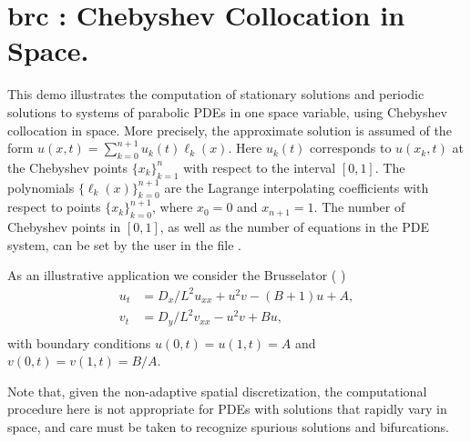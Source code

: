 \documentclass[12pt]{report}
\begin{document}
\newpage
\section{ brc : Chebyshev Collocation in Space.} \label{sec:Demos_brc}
This demo illustrates the computation of stationary solutions and periodic
solutions to systems of parabolic PDEs in one space variable,
using Chebyshev collocation in space.
More precisely, the approximate solution is assumed of the form
$u(x,t) = \sum_{k=0}^{n+1} u_k(t) \ell_k(x)$.
Here $u_k(t)$ corresponds to $u(x_k,t)$ at the Chebyshev points
$\bigl\{ x_k \bigr\}_{k=1}^{n}$ with respect to the interval $[0,1]$.
The polynomials $\bigl\{ \ell_k(x) \bigr\}_{k=0}^{n+1}$ are the Lagrange
interpolating coefficients with respect to points 
$\bigl\{ x_k \bigr\}_{k=0}^{n+1}$, where $x_0=0$ and $x_{n+1}=1$.
The number of Chebyshev points in $[0,1]$,
as well as the number of equations in the PDE system,
can be set by the user in the file .

As an illustrative application we consider the Brusselator
( \citeyear{HoKnKu:87})
\begin{equation} \begin{array}{cl}
  u_t &= {D_x / L^2} u_{xx} + u^2v - (B+1)u + A,  \\
  v_t &= {D_y / L^2} v_{xx} - u^2v + Bu,  \\
\end{array} \end{equation}
with boundary conditions $u(0,t)=u(1,t)=A$
and $v(0,t)=v(1,t)=B/A$.

Note that, given the non-adaptive spatial discretization,
the computational procedure here is not appropriate for
PDEs with solutions that rapidly vary in space, and care must
be taken to recognize spurious solutions and bifurcations.
\end{document}
